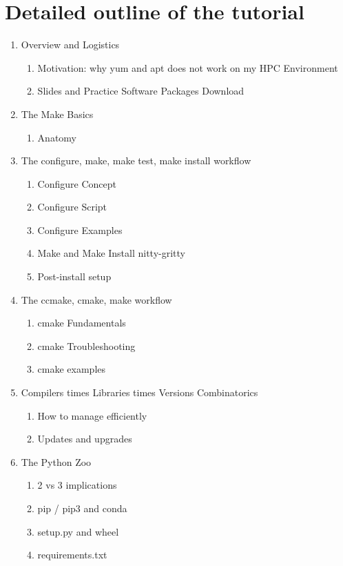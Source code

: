 \documentclass{report}
\begin{document}
\section*{Detailed outline of the tutorial}
\begin{enumerate}
\item Overview and Logistics
  \begin{enumerate}
    \item Motivation: why yum and apt does not work on my HPC Environment
    \item Slides and Practice Software Packages Download
  \end{enumerate}
\item The Make Basics
  \begin{enumerate}
    \item Anatomy
  \end{enumerate}
\item The configure, make, make test, make install workflow
  \begin{enumerate}
    \item Configure Concept
    \item Configure Script
    \item Configure Examples
    \item Make and Make Install nitty-gritty
    \item Post-install setup
  \end{enumerate}
\item The ccmake, cmake, make workflow
    \begin{enumerate}
      \item cmake Fundamentals
      \item cmake Troubleshooting
      \item cmake examples
    \end{enumerate}
\item Compilers times Libraries times Versions Combinatorics
  \begin{enumerate}
    \item How to manage efficiently
    \item Updates and upgrades
  \end{enumerate}
\item The Python Zoo
  \begin{enumerate}
    \item 2 vs 3 implications
    \item pip / pip3 and conda
    \item setup.py and wheel
    \item requirements.txt

\end{enumerate}
\end{enumerate}
\end{document}
